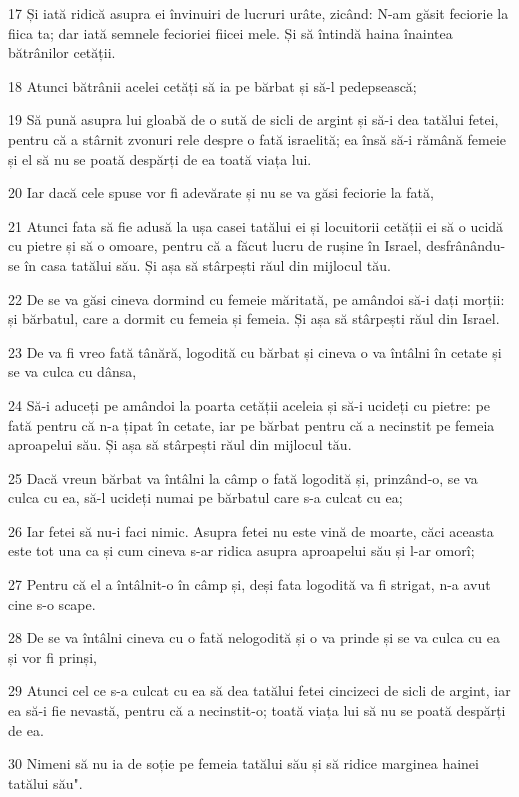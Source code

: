 \par 17 Și iată ridică asupra ei învinuiri de lucruri urâte, zicând: N-am găsit feciorie la fiica ta; dar iată semnele fecioriei fiicei mele. Și să întindă haina înaintea bătrânilor cetății.
\par 18 Atunci bătrânii acelei cetăți să ia pe bărbat și să-l pedepsească;
\par 19 Să pună asupra lui gloabă de o sută de sicli de argint și să-i dea tatălui fetei, pentru că a stârnit zvonuri rele despre o fată israelită; ea însă să-i rămână femeie și el să nu se poată despărți de ea toată viața lui.
\par 20 Iar dacă cele spuse vor fi adevărate și nu se va găsi feciorie la fată,
\par 21 Atunci fata să fie adusă la ușa casei tatălui ei și locuitorii cetății ei să o ucidă cu pietre și să o omoare, pentru că a făcut lucru de rușine în Israel, desfrânându-se în casa tatălui său. Și așa să stârpești răul din mijlocul tău.
\par 22 De se va găsi cineva dormind cu femeie măritată, pe amândoi să-i dați morții: și bărbatul, care a dormit cu femeia și femeia. Și așa să stârpești răul din Israel.
\par 23 De va fi vreo fată tânără, logodită cu bărbat și cineva o va întâlni în cetate și se va culca cu dânsa,
\par 24 Să-i aduceți pe amândoi la poarta cetății aceleia și să-i ucideți cu pietre: pe fată pentru că n-a țipat în cetate, iar pe bărbat pentru că a necinstit pe femeia aproapelui său. Și așa să stârpești răul din mijlocul tău.
\par 25 Dacă vreun bărbat va întâlni la câmp o fată logodită și, prinzând-o, se va culca cu ea, să-l ucideți numai pe bărbatul care s-a culcat cu ea;
\par 26 Iar fetei să nu-i faci nimic. Asupra fetei nu este vină de moarte, căci aceasta este tot una ca și cum cineva s-ar ridica asupra aproapelui său și l-ar omorî;
\par 27 Pentru că el a întâlnit-o în câmp și, deși fata logodită va fi strigat, n-a avut cine s-o scape.
\par 28 De se va întâlni cineva cu o fată nelogodită și o va prinde și se va culca cu ea și vor fi prinși,
\par 29 Atunci cel ce s-a culcat cu ea să dea tatălui fetei cincizeci de sicli de argint, iar ea să-i fie nevastă, pentru că a necinstit-o; toată viața lui să nu se poată despărți de ea.
\par 30 Nimeni să nu ia de soție pe femeia tatălui său și să ridice marginea hainei tatălui său".

